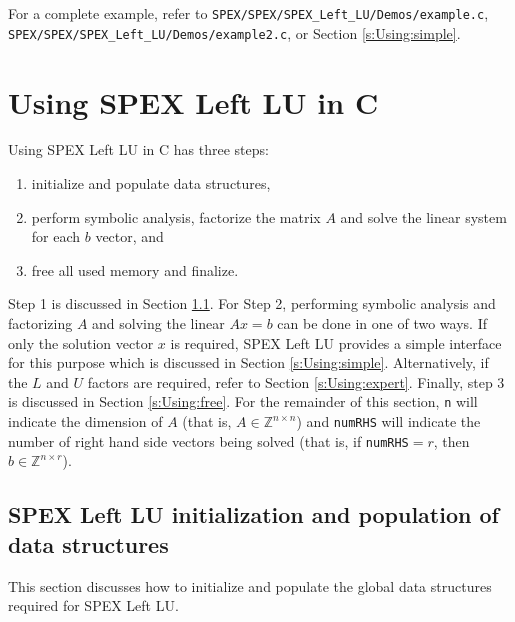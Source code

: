 \documentclass[12pt]{report}
\theoremstyle{definition}
\begin{document}
For a complete example, refer to \verb|SPEX/SPEX/SPEX_Left_LU/Demos/example.c|,  \\
\verb|SPEX/SPEX/SPEX_Left_LU/Demos/example2.c|, or Section \ref{s:Using:simple}.

\cprotect\section{Using SPEX Left LU in C} \label{s:Using}

Using SPEX Left LU in C has three steps:

\begin{enumerate}
\item initialize and populate data structures,
\item perform symbolic analysis,
factorize the matrix $A$ and solve the linear
system for each $b$ vector, and
\item free all used memory and finalize.
\end{enumerate}

Step 1 is discussed in Section \ref{s:Using:init}.  For Step 2, performing
symbolic analysis and factorizing $A$ and solving the linear $A x =b$ can be
done in one of two ways. If only the solution vector $x$ is required, SPEX Left LU
provides a simple interface for this purpose which is discussed in Section
\ref{s:Using:simple}.  Alternatively, if the $L$ and $U$ factors are required,
refer to Section \ref{s:Using:expert}.  Finally, step 3 is discussed in Section
\ref{s:Using:free}. For the remainder of this section, \verb|n| will indicate
the dimension of $A$ (that is, $A \in \mathbb{Z}^{n \times n}$) and
\verb|numRHS| will indicate the number of right hand side vectors being solved
(that is, if \verb|numRHS|$= r$, then $b \in \mathbb{Z}^{n \times r}$).

\cprotect\subsection{SPEX Left LU initialization and population of data structures}
\label{s:Using:init}

This section discusses how to initialize and populate the global data
structures required for SPEX Left LU.
\end{document}
